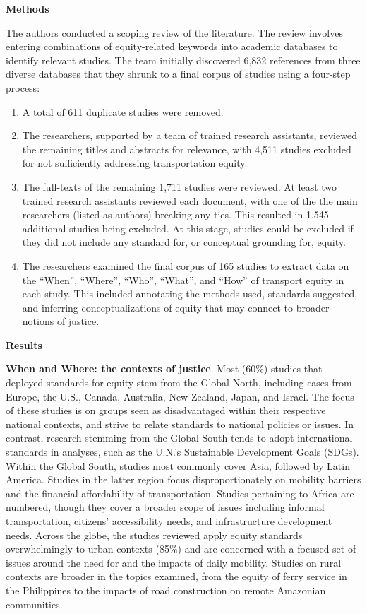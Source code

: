 \documentclass[12pt, oneside]{report}
\providecommand{\tightlist}{%
  \setlength{\itemsep}{0pt}\setlength{\parskip}{0pt}}\usepackage{longtable,booktabs,array}
\begin{document}
\textbf{Methods}

The authors conducted a scoping review of the literature. The review
involves entering combinations of equity-related keywords into academic
databases to identify relevant studies. The team initially discovered
6,832 references from three diverse databases that they shrunk to a
final corpus of studies using a four-step process:

\begin{enumerate}
\def\labelenumi{\arabic{enumi}.}
\tightlist
\item
  A total of 611 duplicate studies were removed.\\
\item
  The researchers, supported by a team of trained research assistants,
  reviewed the remaining titles and abstracts for relevance, with 4,511
  studies excluded for not sufficiently addressing transportation
  equity.\\
\item
  The full-texts of the remaining 1,711 studies were reviewed. At least
  two trained research assistants reviewed each document, with one of
  the the main researchers (listed as authors) breaking any ties. This
  resulted in 1,545 additional studies being excluded. At this stage,
  studies could be excluded if they did not include any standard for, or
  conceptual grounding for, equity.\\
\item
  The researchers examined the final corpus of 165 studies to extract
  data on the ``When'', ``Where'', ``Who'', ``What'', and ``How'' of
  transport equity in each study. This included annotating the methods
  used, standards suggested, and inferring conceptualizations of equity
  that may connect to broader notions of justice.
\end{enumerate}

\textbf{Results}

\textbf{When and Where: the contexts of justice}. Most (60\%) studies
that deployed standards for equity stem from the Global North, including
cases from Europe, the U.S., Canada, Australia, New Zealand, Japan, and
Israel. The focus of these studies is on groups seen as disadvantaged
within their respective national contexts, and strive to relate
standards to national policies or issues. In contrast, research stemming
from the Global South tends to adopt international standards in
analyses, such as the U.N.'s Sustainable Development Goals (SDGs).
Within the Global South, studies most commonly cover Asia, followed by
Latin America. Studies in the latter region focus disproportionately on
mobility barriers and the financial affordability of transportation.
Studies pertaining to Africa are numbered, though they cover a broader
scope of issues including informal transportation, citizens'
accessibility needs, and infrastructure development needs. Across the
globe, the studies reviewed apply equity standards overwhelmingly to
urban contexts (85\%) and are concerned with a focused set of issues
around the need for and the impacts of daily mobility. Studies on rural
contexts are broader in the topics examined, from the equity of ferry
service in the Philippines to the impacts of road construction on remote
Amazonian communities.
\end{document}
